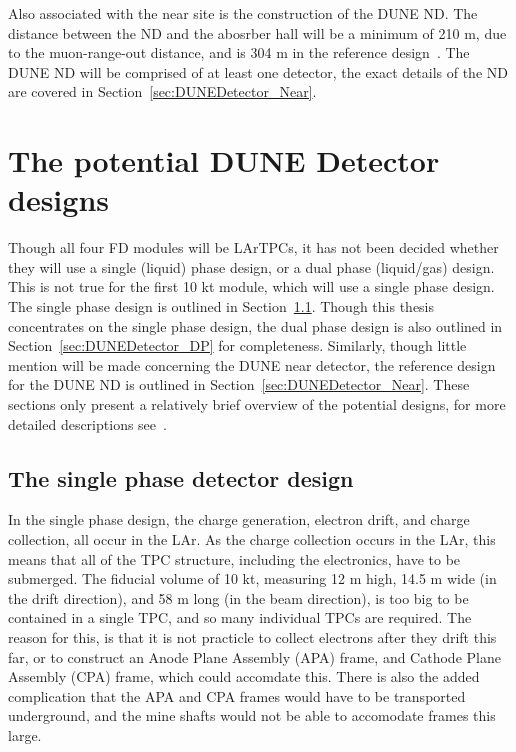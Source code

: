 Also associated with the near site is the construction of the DUNE ND. The distance between the ND and the abosrber hall will be a minimum of 210 m, due to the muon-range-out distance, and is 304 m in the reference design~\citep{DUNECDR_V3}. The DUNE ND will be comprised of at least one detector, the exact details of the ND are covered in Section~\ref{sec:DUNEDetector_Near}. \\

\section{The potential DUNE Detector designs} \label{sec:DUNEDetector} %
Though all four FD modules will be LArTPCs, it has not been decided whether they will use a single (liquid) phase design, or a dual phase (liquid/gas) design. This is not true for the first 10 kt module, which will use a single phase design. The single phase design is outlined in Section~\ref{sec:DUNEDetector_SP}. Though this thesis concentrates on the single phase design, the dual phase design is also outlined in Section~\ref{sec:DUNEDetector_DP} for completeness. Similarly, though little mention will be made concerning the DUNE near detector, the reference design for the DUNE ND is outlined in Section~\ref{sec:DUNEDetector_Near}. These sections only present a relatively brief overview of the potential designs, for more detailed descriptions see~\citep{DUNECDR_V4}. \\

\subsection{The single phase detector design} \label{sec:DUNEDetector_SP}
In the single phase design, the charge generation, electron drift, and charge collection, all occur in the LAr. As the charge collection occurs in the LAr, this means that all of the TPC structure, including the electronics, have to be submerged. The fiducial volume of 10 kt, measuring 12 m high, 14.5 m wide (in the drift direction), and 58 m long (in the beam direction), is too big to be contained in a single TPC, and so many individual TPCs are required. The reason for this, is that it is not practicle to collect electrons after they drift this far, or to construct an Anode Plane Assembly (APA) frame, and Cathode Plane Assembly (CPA) frame, which could accomdate this. There is also the added complication that the APA and CPA frames would have to be transported underground, and the mine shafts would not be able to accomodate frames this large. \\

